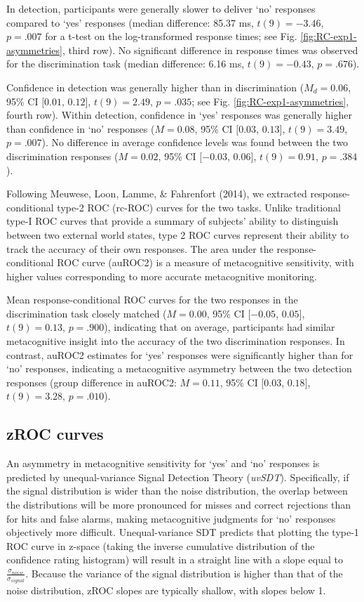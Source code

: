 \documentclass[12pt,twoside]{reedthesis}
\begin{document}
In detection, participants were generally slower to deliver `no' responses compared to `yes' responses (median difference: 85.37 ms, \(t(9) = -3.46\), \(p = .007\) for a t-test on the log-transformed response times; see Fig. \ref{fig:RC-exp1-asymmetries}, third row). No significant difference in response times was observed for the discrimination task (median difference: 6.16 ms, \(t(9) = -0.43\), \(p = .676\)).

Confidence in detection was generally higher than in discrimination (\(M_d = 0.06\), 95\% CI \([0.01\), \(0.12]\), \(t(9) = 2.49\), \(p = .035\); see Fig. \ref{fig:RC-exp1-asymmetries}, fourth row). Within detection, confidence in `yes' responses was generally higher than confidence in `no' responses (\(M = 0.08\), 95\% CI \([0.03\), \(0.13]\), \(t(9) = 3.49\), \(p = .007\)). No difference in average confidence levels was found between the two discrimination responses (\(M = 0.02\), 95\% CI \([-0.03\), \(0.06]\), \(t(9) = 0.91\), \(p = .384\)).

Following Meuwese, Loon, Lamme, \& Fahrenfort (2014), we extracted response-conditional type-2 ROC (rc-ROC) curves for the two tasks. Unlike traditional type-I ROC curves that provide a summary of subjects' ability to distinguish between two external world states, type 2 ROC curves represent their ability to track the accuracy of their own responses. The area under the response-conditional ROC curve (auROC2) is a measure of metacognitive sensitivity, with higher values corresponding to more accurate metacognitive monitoring.

Mean response-conditional ROC curves for the two responses in the discrimination task closely matched (\(M = 0.00\), 95\% CI \([-0.05\), \(0.05]\), \(t(9) = 0.13\), \(p = .900\)), indicating that on average, participants had similar metacognitive insight into the accuracy of the two discrimination responses. In contrast, auROC2 estimates for `yes' responses were significantly higher than for `no' responses, indicating a metacognitive asymmetry between the two detection responses (group difference in auROC2: \(M = 0.11\), 95\% CI \([0.03\), \(0.18]\), \(t(9) = 3.28\), \(p = .010\)).

\hypertarget{zroc-curves}{%
\subsection{zROC curves}\label{zroc-curves}}

An asymmetry in metacognitive sensitivity for `yes' and `no' responses is predicted by unequal-variance Signal Detection Theory (\emph{uvSDT}). Specifically, if the signal distribution is wider than the noise distribution, the overlap between the distributions will be more pronounced for misses and correct rejections than for hits and false alarms, making metacognitive judgments for `no' responses objectively more difficult. Unequal-variance SDT predicts that plotting the type-1 ROC curve in z-space (taking the inverse cumulative distribution of the confidence rating histogram) will result in a straight line with a slope equal to \(\frac{\sigma_{noise}}{\sigma_{signal}}\). Because the variance of the signal distribution is higher than that of the noise distribution, zROC slopes are typically shallow, with slopes below 1.
\end{document}
